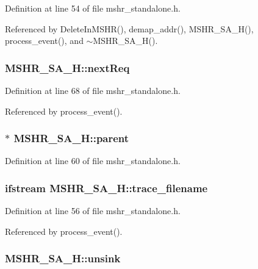 Definition at line 54 of file mshr\_\-standalone.h.

Referenced by DeleteInMSHR(), demap\_\-addr(), MSHR\_\-SA\_\-H(), process\_\-event(), and $\sim$MSHR\_\-SA\_\-H().
\subsubsection[{nextReq}]{ {\bf MSHR\_\-SA\_\-H::nextReq}}\label{classMSHR__SA__H_6f76022d9e5ab27d951bcadc2389f4d1}




Definition at line 68 of file mshr\_\-standalone.h.

Referenced by process\_\-event().
\subsubsection[{parent}]{$\ast$ {\bf MSHR\_\-SA\_\-H::parent}}\label{classMSHR__SA__H_be5f47f63e0bc44f2efeba2424169ca2}




Definition at line 60 of file mshr\_\-standalone.h.
\subsubsection[{trace\_\-filename}]{\setlength{\rightskip}{0pt plus 5cm}ifstream {\bf MSHR\_\-SA\_\-H::trace\_\-filename}}\label{classMSHR__SA__H_83dbc17d0d0ba75fcc856e9b3292e366}




Definition at line 56 of file mshr\_\-standalone.h.

Referenced by process\_\-event().
\subsubsection[{unsink}]{ {\bf MSHR\_\-SA\_\-H::unsink}}\label{classMSHR__SA__H_3576bfb9e179c55426f0458568c1925c}




